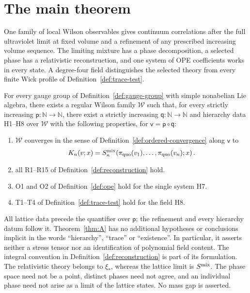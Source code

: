 \section{The main theorem}\label{sec:main-theorem}

One family of local Wilson observables gives continuum correlations after the full ultraviolet limit at fixed volume and a refinement of any prescribed increasing volume sequence. The limiting mixture has a phase decomposition, a selected phase has a relativistic reconstruction, and one system of OPE coefficients works in every state. A degree-four field distinguishes the selected theory from every finite Wick profile of Definition~\ref{def:trace-test}.

\begin{theorem}[Existence]\label{thm:A}
For every gauge group of Definition~\ref{def:gauge-group} with simple nonabelian Lie algebra, there exists a regular Wilson family $\mathcal W$ such that, for every strictly increasing $\mathsf p:\mathbb N\to\mathbb N$, there exist a strictly increasing $\mathsf q:\mathbb N\to\mathbb N$ and hierarchy data H1–H8 over $\mathcal W$ with the following properties, for $\mathsf v=\mathsf p\circ\mathsf q$:

\begin{enumerate}[label=\textup{A-P\arabic*.},leftmargin=3.5em,nosep]
\item $\mathcal W$ converges in the sense of Definition~\ref{def:ordered-convergence} along $\mathsf v$ to
\begin{equation}\label{eq:main-kernel}
K_n(v;x)=S_n^{\mathrm{mix}}(\pi_{\rm quo}(v_1),\ldots,\pi_{\rm quo}(v_n);x)\,.
\end{equation}
\item all R1–R15 of Definition~\ref{def:reconstruction} hold.
\item O1 and O2 of Definition~\ref{def:ope} hold for the single system H7.
\item T1–T4 of Definition~\ref{def:trace-test} hold for the field H8.
\end{enumerate}
\end{theorem}

\begin{remark}
All lattice data precede the quantifier over $\mathsf p$; the refinement and every hierarchy datum follow it. Theorem~\ref{thm:A} has no additional hypotheses or conclusions implicit in the words “hierarchy”, “trace” or “existence”. In particular, it asserts neither a stress tensor nor an identification of polynomial field content. The integral convention in Definition~\ref{def:reconstruction} is part of its formulation. The relativistic theory belongs to $\xi_*$, whereas the lattice limit is $S^{\rm mix}$. The phase space need not be a point, distinct phases need not agree, and an individual phase need not arise as a limit of the lattice states. No mass gap is asserted.
\end{remark}

